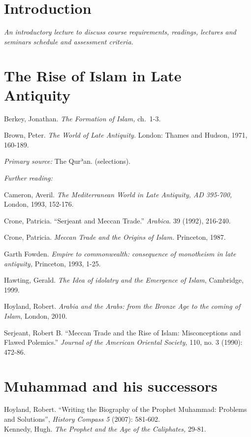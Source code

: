 \documentclass[
]{book}
\begin{document}
\hypertarget{introduction}{%
\chapter{Introduction}\label{introduction}}

\emph{An introductory lecture to discuss course requirements, readings, lectures and seminars schedule and assessment criteria.}

\hypertarget{the-rise-of-islam-in-late-antiquity}{%
\chapter{The Rise of Islam in Late Antiquity}\label{the-rise-of-islam-in-late-antiquity}}

Berkey, Jonathan. \emph{The Formation of Islam,} ch.~1-3.

Brown, Peter. \emph{The World of Late Antiquity.} London: Thames and Hudson, 1971, 160-189.

\emph{Primary source:} The Qurʾan. (selections).

\emph{Further reading:}

Cameron, Averil. \emph{The Mediterranean World in Late Antiquity, AD 395-700,} London, 1993, 152-176.

Crone, Patricia. ``Serjeant and Meccan Trade.'' \emph{Arabica}. 39 (1992), 216-240.

Crone, Patricia. \emph{Meccan Trade and the Origins of Islam.} Princeton, 1987.

Garth Fowden. \emph{Empire to commonwealth: consequence of monotheism in late antiquity,} Princeton, 1993, 1-25.

Hawting, Gerald. \emph{The Idea of idolatry and the Emergence of Islam}, Cambridge, 1999.

Hoyland, Robert. \emph{Arabia and the Arabs: from the Bronze Age to the coming of Islam}, London, 2010.

Serjeant, Robert B. ``Meccan Trade and the Rise of Islam: Misconceptions and Flawed Polemics.'' \emph{Journal of the American Oriental Society,} 110, no. 3 (1990): 472-86.

\hypertarget{muhammad-and-his-successors}{%
\chapter{Muhammad and his successors}\label{muhammad-and-his-successors}}

Hoyland, Robert. ``Writing the Biography of the Prophet Muhammad: Problems and Solutions'', \emph{History Compass 5} (2007): 581-602.\\
Kennedy, Hugh. \emph{The Prophet and the Age of the Caliphates,} 29-81.\\
\end{document}
